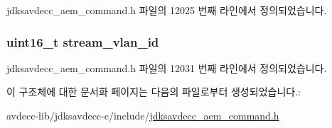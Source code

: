 jdksavdecc\+\_\+aem\+\_\+command.\+h 파일의 12025 번째 라인에서 정의되었습니다.

\subsubsection[{\texorpdfstring{stream\+\_\+vlan\+\_\+id}{stream_vlan_id}}]{\setlength{\rightskip}{0pt plus 5cm}uint16\+\_\+t stream\+\_\+vlan\+\_\+id}\hypertarget{structjdksavdecc__aem__command__get__stream__info__response_a8901fae0712dfce7341cdcbe8b43035c}{}\label{structjdksavdecc__aem__command__get__stream__info__response_a8901fae0712dfce7341cdcbe8b43035c}


jdksavdecc\+\_\+aem\+\_\+command.\+h 파일의 12031 번째 라인에서 정의되었습니다.



이 구조체에 대한 문서화 페이지는 다음의 파일로부터 생성되었습니다.\+:\begin{DoxyCompactItemize}
\item 
avdecc-\/lib/jdksavdecc-\/c/include/\hyperlink{jdksavdecc__aem__command_8h}{jdksavdecc\+\_\+aem\+\_\+command.\+h}\end{DoxyCompactItemize}
